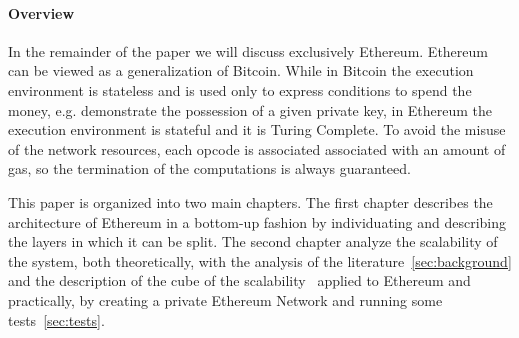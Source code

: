 \paragraph{Overview}
In the remainder of the paper we will discuss exclusively Ethereum. Ethereum 
can be viewed as a generalization of Bitcoin. While in Bitcoin the execution 
environment is stateless and is used only to express conditions to spend the 
money, e.g. demonstrate the possession of a given private key, in Ethereum the 
execution environment is stateful and it is Turing Complete. To avoid the 
misuse of the network resources, each opcode is associated associated with an 
amount of gas, so the termination of the computations is always guaranteed.

This paper is organized into two main chapters. The first chapter describes the 
architecture of Ethereum in a bottom-up fashion by individuating and describing
the layers in which it can be split. The second chapter analyze the scalability 
of the system, both theoretically, with the analysis of the 
literature~\autoref{sec:background} and the description of the cube of the 
scalability~\cite{bib:art-of-scalability} applied to Ethereum and practically, 
by creating a private Ethereum Network and running some 
tests~\autoref{sec:tests}.




